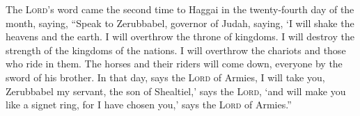  The \textsc{Lord}'s word came the second time to Haggai
in the twenty-fourth day of the month, saying,  ``Speak
to Zerubbabel, governor of Judah, saying, `I will shake the heavens and
the earth.  I will overthrow the throne of kingdoms. I
will destroy the strength of the kingdoms of the nations. I will
overthrow the chariots and those who ride in them. The horses and their
riders will come down, everyone by the sword of his brother.
 In that day, says the \textsc{Lord} of Armies, I will
take you, Zerubbabel my servant, the son of Shealtiel,' says the
\textsc{Lord}, `and will make you like a signet ring, for I have chosen
you,' says the \textsc{Lord} of Armies.''

